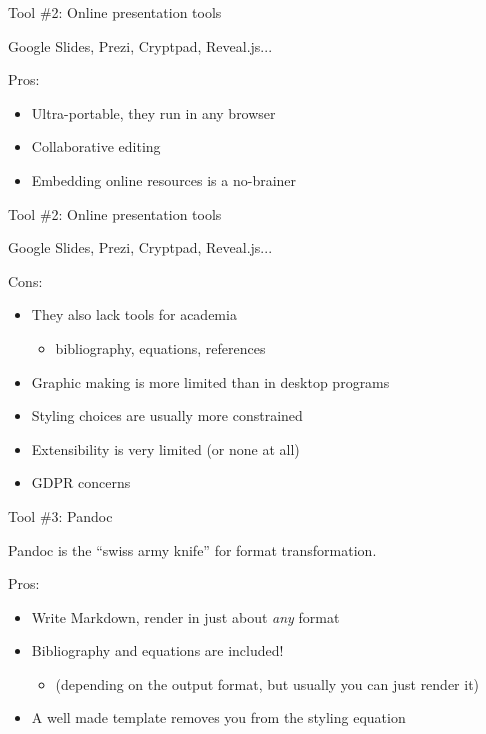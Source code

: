 \documentclass[aspectratio=169]{divoc}
\begin{document}
\begin{frame}{Tool \#2: Online presentation tools}
  \begin{center}
    Google Slides, Prezi, Cryptpad, Reveal.js...
  \end{center}

  Pros:
  \begin{itemize}
    \item Ultra-portable, they run in any browser
    \item Collaborative editing
    \item Embedding online resources is a no-brainer
  \end{itemize}
\end{frame}
\begin{frame}{Tool \#2: Online presentation tools}
  \begin{center}
    Google Slides, Prezi, Cryptpad, Reveal.js...
  \end{center}

  Cons:
  \begin{itemize}
    \item They also lack tools for academia
          \begin{itemize}
            \item bibliography, equations, references
          \end{itemize}
    \item Graphic making is more limited than in desktop programs
    \item Styling choices are usually more constrained
    \item Extensibility is very limited (or none at all)
    \item GDPR concerns
  \end{itemize}
\end{frame}
\begin{frame}{Tool \#3: Pandoc}
  \begin{center}
    Pandoc is the \enquote{swiss army knife} for format transformation.
  \end{center}

  Pros:
  \begin{itemize}
    \item Write Markdown, render in just about \emph{any} format
    \item Bibliography and equations are included!
          \begin{itemize}
            \item (depending on the output format, but usually you can just render it)
          \end{itemize}
    \item A well made template removes you from the styling equation 
  \end{itemize}
\end{frame}
\end{document}
